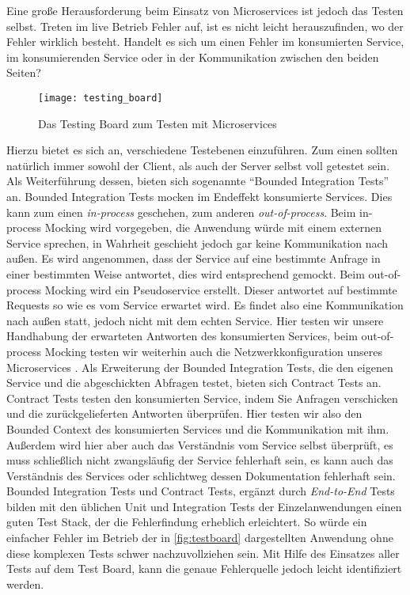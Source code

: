 Eine große Herausforderung beim Einsatz von Microservices ist jedoch das Testen selbst. Treten im live Betrieb Fehler auf, ist es nicht leicht herauszufinden, wo der Fehler wirklich besteht. Handelt es sich um einen Fehler im konsumierten Service, im konsumierenden Service oder in der Kommunikation zwischen den beiden Seiten?

\begin{wrapfigure}{l}{0.5\textwidth}
    \caption{Das Testing Board zum Testen mit Microservices \cite{rails:soa}}
    \label{fig:testboard}
    \texttt{[image: testing\_board]}
\end{wrapfigure}

Hierzu bietet es sich an, verschiedene Testebenen einzuführen. Zum einen sollten natürlich immer sowohl der Client, als auch der Server selbst voll getestet sein. Als Weiterführung dessen, bieten sich sogenannte \enquote{Bounded Integration Tests} \cite[vgl.][]{rails:soa} an. Bounded Integration Tests mocken im Endeffekt konsumierte Services. Dies kann zum einen \textit{in-process} geschehen, zum anderen \textit{out-of-process}. Beim in-process Mocking wird vorgegeben, die Anwendung würde mit einem externen Service sprechen, in Wahrheit geschieht jedoch gar keine Kommunikation nach außen. Es wird angenommen, dass der Service auf eine bestimmte Anfrage in einer bestimmten Weise antwortet, dies wird entsprechend gemockt. Beim out-of-process Mocking wird ein Pseudoservice erstellt. Dieser antwortet auf bestimmte Requests so wie es vom Service erwartet wird. Es findet also eine Kommunikation nach außen statt, jedoch nicht mit dem echten Service. Hier testen wir unsere Handhabung der erwarteten Antworten des konsumierten Services, beim out-of-process Mocking testen wir weiterhin auch die Netzwerkkonfiguration unseres Microservices \cite{fowler:mstesting}.
Als Erweiterung der Bounded Integration Tests, die den eigenen Service und die abgeschickten Abfragen testet, bieten sich Contract Tests \cite[vgl.][]{fowler:contracts} an. Contract Tests testen den konsumierten Service, indem Sie Anfragen verschicken und die zurückgelieferten Antworten überprüfen. Hier testen wir also den Bounded Context \cite[vgl.][]{fowler:bounded} des konsumierten Services und die Kommunikation mit ihm. Außerdem wird hier aber auch das Verständnis vom Service selbst überprüft, es muss schließlich nicht zwangsläufig der Service fehlerhaft sein, es kann auch das Verständnis des Services oder schlichtweg dessen Dokumentation fehlerhaft sein.
Bounded Integration Tests und Contract Tests, ergänzt durch \textit{End-to-End} Tests bilden mit den üblichen Unit und Integration Tests der Einzelanwendungen einen guten Test Stack, der die Fehlerfindung erheblich erleichtert. So würde ein einfacher Fehler im Betrieb der in \autoref{fig:testboard} dargestellten Anwendung ohne diese komplexen Tests schwer nachzuvollziehen sein. Mit Hilfe des Einsatzes aller Tests auf dem Test Board, kann die genaue Fehlerquelle jedoch leicht identifiziert werden.

